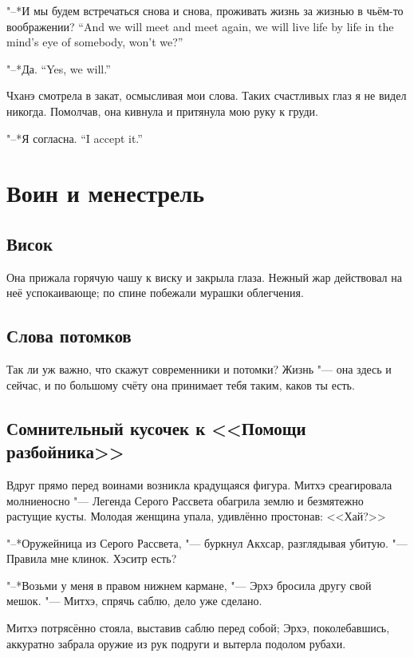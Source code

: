 {"--*И мы будем встречаться снова и снова, проживать жизнь за жизнью в чьём-то воображении?}
{``And we will meet and meet again, we will live life by life in the mind's eye of somebody, won't we?''}

{"--*Да.}
{``Yes, we will.''}

Чханэ смотрела в закат, осмысливая мои слова.
Таких счастливых глаз я не видел никогда.
Помолчав, она кивнула и притянула мою руку к груди.

{"--*Я согласна.}
{``I accept it.''}

\chapter{Воин и менестрель}

\section{Висок}

Она прижала горячую чашу к виску и закрыла глаза.
Нежный жар действовал на неё успокаивающе;
по спине побежали мурашки облегчения.

\section{Слова потомков}

Так ли уж важно, что скажут современники и потомки?
Жизнь "--- она здесь и сейчас, и по большому счёту она принимает тебя таким, каков ты есть.

\section{Сомнительный кусочек к <<Помощи разбойника>>}

Вдруг прямо перед воинами возникла крадущаяся фигура.
Митхэ среагировала молниеносно "--- Легенда Серого Рассвета обагрила землю и безмятежно растущие кусты.
Молодая женщина упала, удивлённо простонав: <<Хай?>>

"--*Оружейница из Серого Рассвета, "--- буркнул Акхсар, разглядывая убитую.
"--- Правила мне клинок.
Хэситр есть?

"--*Возьми у меня в правом нижнем кармане, "--- Эрхэ бросила другу свой мешок.
"--- Митхэ, спрячь саблю, дело уже сделано.

Митхэ потрясённо стояла, выставив саблю перед собой;
Эрхэ, поколебавшись, аккуратно забрала оружие из рук подруги и вытерла подолом рубахи.

